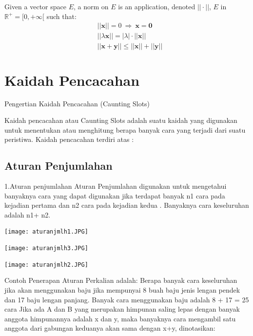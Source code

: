\documentclass[11pt,fleqn]{book} %
\begin{document}
\begin{definition}
Given a vector space $E$, a norm on $E$ is an application, denoted $||\cdot||$, $E$ in $\mathbb{R}^+=[0,+\infty[$ such that:
\begin{align}
& ||\mathbf{x}||=0\ \Rightarrow\ \mathbf{x}=\mathbf{0}\\
& ||\lambda \mathbf{x}||=|\lambda|\cdot ||\mathbf{x}||\\
& ||\mathbf{x}+\mathbf{y}||\leq ||\mathbf{x}||+||\mathbf{y}||
\end{align}
\end{definition}

\chapter{Kaidah Pencacahan}

Pengertian Kaidah Pencacahan (Caunting Slots)


Kaidah pencacahan atau Caunting Slots adalah suatu kaidah yang digunakan untuk menentukan atau menghitung berapa banyak cara yang terjadi dari suatu peristiwa. Kaidah pencacahan terdiri atas :

\section{Aturan Penjumlahan}
1.Aturan penjumlahan
Aturan Penjumlahan digunakan untuk mengetahui banyaknya cara yang dapat digunakan jika terdapat banyak n1 cara pada kejadian pertama dan n2 cara pada kejadian kedua . Banyaknya
cara keseluruhan adalah n1+ n2.

\begin{center}
\texttt{[image: aturanjmlh1.JPG]}
\end{center}

\begin{center}
\texttt{[image: aturanjmlh3.JPG]}
\end{center}

\begin{center}
\texttt{[image: aturanjmlh2.JPG]}
\end{center}
Contoh Penerapan Aturan Perkalian adalah:
Berapa banyak cara keseluruhan jika akan menggunakan baju jika mempunyai 8 buah baju jenis
lengan pendek dan 17 baju lengan panjang.
Banyak cara menggunakan baju adalah 8 + 17 = 25 cara
 Jika ada A dan B yang merupakan himpunan saling lepas dengan banyak anggota himpunannya adalah x dan y, maka banyaknya cara mengambil satu anggota dari gabungan keduanya akan sama dengan x+y, dinotasikan:
 
\end{document}
